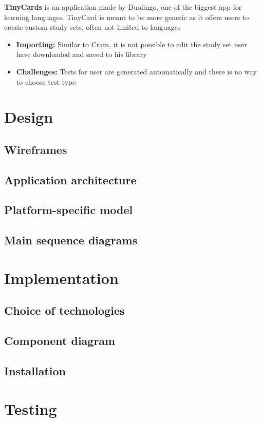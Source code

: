 \documentclass[thesis=B,english]{FITthesis}[2012/10/20]
\begin{document}
\textbf{TinyCards} is an application made by Duolingo, one of the biggest app for learning languages. TinyCard is meant to be more generic as it offers users to create custom study sets, often not limited to languages
	\begin{itemize}
		\item \textbf{Importing:} Similar to Cram, it is not possible to edit the study set user have downloaded and saved to his library
		\item \textbf{Challenges:} Tests for user are generated automatically and there is no way to choose test type
	\end{itemize}
	
\newpage

\chapter{Design}
\section{Wireframes}
\section{Application architecture}
\section{Platform-specific model}
\section{Main sequence diagrams}

\chapter{Implementation}
\section{Choice of technologies}
\section{Component diagram}
\section{Installation}


\chapter{Testing}
\end{document}
